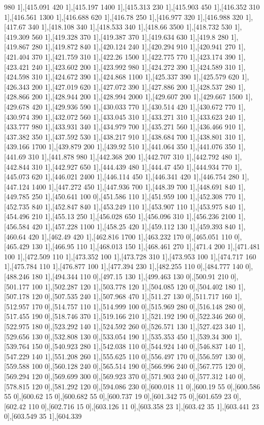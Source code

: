 {980 1],[415.091 420 1],[415.197 1400 1],[415.313 230 1],[415.903 450 1],[416.352 310 1],[416.561 1300 1],[416.688 620 1],[416.78 250 1],[416.977 320 1],[416.988 320 1],[417.67 340 1],[418.108 340 1],[418.533 340 1],[418.66 3500 1],[418.732 530 1],[419.309 560 1],[419.328 370 1],[419.387 370 1],[419.634 630 1],[419.8 280 1],[419.867 280 1],[419.872 840 1],[420.124 240 1],[420.294 910 1],[420.941 270 1],[421.404 370 1],[421.759 310 1],[422.26 1500 1],[422.775 770 1],[423.174 390 1],[423.421 240 1],[423.602 200 1],[423.992 980 1],[424.272 390 1],[424.589 310 1],[424.598 310 1],[424.672 390 1],[424.868 1100 1],[425.337 390 1],[425.579 620 1],[426.343 200 1],[427.019 620 1],[427.072 390 1],[427.886 200 1],[428.537 280 1],[428.866 200 1],[428.944 200 1],[428.994 2000 1],[429.607 200 1],[429.667 1500 1],[429.678 420 1],[429.936 590 1],[430.033 770 1],[430.514 420 1],[430.672 770 1],[430.974 390 1],[432.072 560 1],[433.045 310 1],[433.271 310 1],[433.623 240 1],[433.777 980 1],[433.931 340 1],[434.979 700 1],[435.271 560 1],[436.466 910 1],[437.382 350 1],[437.592 530 1],[438.217 910 1],[438.684 700 1],[438.801 310 1],[439.166 1700 1],[439.879 200 1],[439.92 510 1],[441.064 350 1],[441.076 350 1],[441.69 310 1],[441.878 980 1],[442.368 200 1],[442.707 310 1],[442.792 480 1],[442.844 310 1],[442.927 650 1],[444.439 480 1],[444.47 450 1],[444.934 770 1],[445.073 620 1],[446.021 2400 1],[446.114 450 1],[446.341 420 1],[446.754 280 1],[447.124 1400 1],[447.272 450 1],[447.936 700 1],[448.39 700 1],[448.691 840 1],[449.785 250 1],[450.641 100 0],[451.586 110 1],[451.959 100 1],[452.308 770 1],[452.735 840 1],[452.847 840 1],[453.249 110 1],[453.907 110 1],[453.975 840 1],[454.496 210 1],[455.13 250 1],[456.028 650 1],[456.096 310 1],[456.236 2100 1],[456.584 420 1],[457.228 1100 1],[458.25 420 1],[459.112 130 1],[459.393 840 1],[460.64 420 1],[462.49 420 1],[462.816 1700 1],[463.232 170 0],[465.051 110 0],[465.429 130 1],[466.95 110 1],[468.013 150 1],[468.461 270 1],[471.4 200 1],[471.481 100 1],[472.509 110 1],[473.352 100 1],[473.728 310 1],[473.953 100 1],[474.717 160 1],[475.784 110 1],[476.877 100 1],[477.394 230 1],[482.255 110 0],[484.777 140 0],[488.246 180 1],[494.344 110 0],[497.15 130 1],[499.463 130 0],[500.91 210 0],[501.177 100 1],[502.287 120 1],[503.778 120 1],[504.085 120 0],[504.402 180 1],[507.178 120 0],[507.535 240 1],[507.968 470 1],[511.27 130 0],[511.717 160 1],[512.957 170 0],[514.757 110 1],[514.999 100 0],[515.969 280 0],[516.148 280 0],[517.455 190 0],[518.746 370 1],[519.166 210 1],[521.192 190 0],[522.346 260 0],[522.975 180 0],[523.292 140 1],[524.592 260 0],[526.571 130 1],[527.423 340 1],[529.656 130 0],[532.808 130 0],[533.054 190 1],[535.353 450 1],[539.34 300 1],[539.764 150 0],[540.923 280 1],[542.038 110 0],[544.924 140 0],[546.837 140 1],[547.229 140 1],[551.208 260 1],[555.625 110 0],[556.497 170 0],[556.597 130 0],[559.588 100 0],[560.128 240 0],[565.514 190 0],[566.996 240 0],[567.775 120 0],[569.294 120 0],[569.699 300 0],[569.923 370 0],[571.903 240 0],[577.312 140 0],[578.815 120 0],[581.292 120 0],[594.086 230 0],[600.018 11 0],[600.19 55 0],[600.586 55 0],[600.62 15 0],[600.682 55 0],[600.737 19 0],[601.342 75 0],[601.659 23 0],[602.42 110 0],[602.716 15 0],[603.126 11 0],[603.358 23 1],[603.42 35 1],[603.441 23 0],[603.549 35 1],[604.339 }
